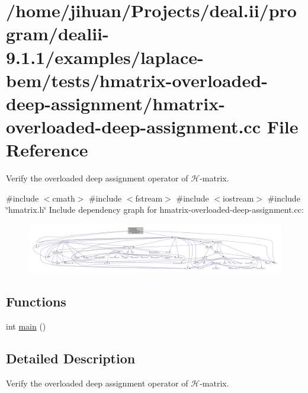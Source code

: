 \hypertarget{hmatrix-overloaded-deep-assignment_8cc}{}\section{/home/jihuan/\+Projects/deal.ii/program/dealii-\/9.1.1/examples/laplace-\/bem/tests/hmatrix-\/overloaded-\/deep-\/assignment/hmatrix-\/overloaded-\/deep-\/assignment.cc File Reference}
\label{hmatrix-overloaded-deep-assignment_8cc}


Verify the overloaded deep assignment operator of $\mathcal{H}$-\/matrix.  


{\ttfamily \#include $<$cmath$>$}\newline
{\ttfamily \#include $<$fstream$>$}\newline
{\ttfamily \#include $<$iostream$>$}\newline
{\ttfamily \#include \char`\"{}hmatrix.\+h\char`\"{}}\newline
Include dependency graph for hmatrix-\/overloaded-\/deep-\/assignment.cc\+:\nopagebreak
\begin{figure}[H]
\begin{center}
\leavevmode
\includegraphics[width=350pt]{hmatrix-overloaded-deep-assignment_8cc__incl}
\end{center}
\end{figure}
\subsection*{Functions}
\begin{DoxyCompactItemize}
\item 
int \hyperlink{hmatrix-overloaded-deep-assignment_8cc_ae66f6b31b5ad750f1fe042a706a4e3d4}{main} ()
\end{DoxyCompactItemize}


\subsection{Detailed Description}
Verify the overloaded deep assignment operator of $\mathcal{H}$-\/matrix. 

